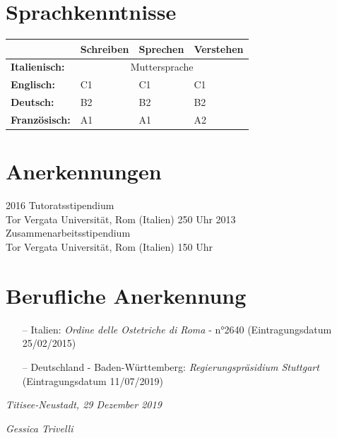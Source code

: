 \documentclass[11pt]{friggeri-cv}
\begin{document}
\newpage
\section{Sprachkenntnisse}
\begin{table}[!h]
  \centering
  \renewcommand{\arraystretch}{1.45}
  \begin{tabular}{ p{3cm} p{3cm} p{3cm} p{3cm} }
    \hline
    & \textbf{Schreiben}       & \textbf{Sprechen} & \textbf{Verstehen}  \\     \hline
    \textbf{Italienisch:}      & \multicolumn{3}{c}{Muttersprache}       \\
    \textbf{Englisch:}         & C1 & C1 & C1                            \\ 
    \textbf{Deutsch:}          & B2 & B2 & B2                            \\ 
    \textbf{Franz\"{o}sisch:}  & A1 & A1 & A2                            \\    \hline
  \end{tabular}
\end{table}

\section{Anerkennungen}
\begin{entrylist}
  \entry
    {2016}
    {Tutoratsstipendium}
    {\\Tor Vergata Universit\"{a}t, Rom (Italien)}
    {250 Uhr}
  \entry
    {2013}
    {Zusammenarbeitsstipendium}
    {\\Tor Vergata Universit\"{a}t, Rom (Italien)}
    {150 Uhr}
\end{entrylist}

\vspace{-10pt}
\section{Berufliche Anerkennung}
\begin{itemize}
  \item[--] Italien: \emph{Ordine delle Ostetriche di Roma} - n°2640 (Eintragungsdatum 25/02/2015)
  \item[--] Deutschland - Baden-W\"{u}rttemberg: \emph{Regierungspr\"{a}sidium Stuttgart} (Eintragungsdatum 11/07/2019)
\end{itemize}


\vspace{75pt}
\begin{flushleft}
\large\emph{Titisee-Neustadt, 29 Dezember 2019}
\end{flushleft}
\begin{flushright}
\large\emph{Gessica Trivelli}
\end{flushright}
\end{document}
